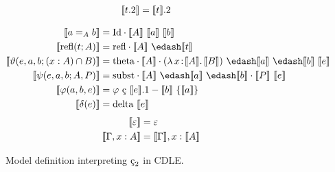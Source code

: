 \begin{figure}
\begin{minipage}{0.5\textwidth}
\begin{align*}
            \llbracket t.2 \rrbracket &= \llbracket t \rrbracket.2
        \end{align*}
    \end{minipage}
    \begin{align*}
        \sema{a =_A b} &= \cId \cdot \sema{A}\ \sema{a}\ \sema{b} \\
        \sema{\text{refl}(t; A)} &= \crefl \cdot \sema{A}\ \edash \sema{t} \\
        \sema{\vartheta(e, a, b; (x : A) \cap B)} &= \ctheta \cdot \sema{A} \cdot (\abs{\lambda}{x}{\sema{A}}{\sema{B}})\ \edash \sema{a}\ \edash \sema{b}\ \sema{e} \\
        \sema{\psi(e, a, b; A, P)} &= \csubst  \cdot \sema{A}\ \edash \sema{a}\ \edash \sema{b} \cdot \sema{P}\ \sema{e} \\
        \sema{\varphi(a, b, e)} &= \varphi\ \text{\c{c}}\ \sema{e}.1 - \sema{b}\ \{ \sema{a} \} \\
        \sema{\delta(e)} &= \cdelta\ \sema{e}
    \end{align*}
    \begin{align*}
        \llbracket \varepsilon \rrbracket &= \varepsilon \\
        \llbracket \Gamma, x : A \rrbracket &= \llbracket \Gamma \rrbracket, x : \llbracket A \rrbracket
    \end{align*}
    \caption{
        Model definition interpreting $\ced$ in CDLE.
    }
    \label{fig:4:model}
\end{figure}

